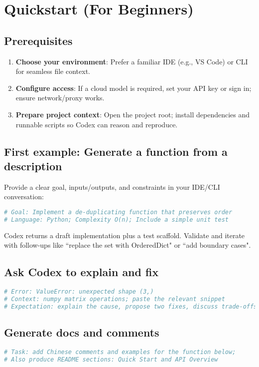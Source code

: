 \documentclass{article}
\begin{document}
\section{Quickstart (For Beginners)}
\subsection{Prerequisites}
\begin{enumerate}
  \item \textbf{Choose your environment}: Prefer a familiar IDE (e.g., VS Code) or CLI for seamless file context.
  \item \textbf{Configure access}: If a cloud model is required, set your API key or sign in; ensure network/proxy works.
  \item \textbf{Prepare project context}: Open the project root; install dependencies and runnable scripts so Codex can reason and reproduce.
\end{enumerate}

\subsection{First example: Generate a function from a description}
Provide a clear goal, inputs/outputs, and constraints in your IDE/CLI conversation:

\begin{lstlisting}[language=bash,caption={Describe the task in plain English}]
# Goal: Implement a de-duplicating function that preserves order
# Language: Python; Complexity O(n); Include a simple unit test
\end{lstlisting}

Codex returns a draft implementation plus a test scaffold. Validate and iterate with follow-ups like ``replace the set with OrderedDict" or ``add boundary cases".

\subsection{Ask Codex to explain and fix}
\begin{lstlisting}[language=bash,caption={Explain an error and propose fixes}]
# Error: ValueError: unexpected shape (3,)
# Context: numpy matrix operations; paste the relevant snippet
# Expectation: explain the cause, propose two fixes, discuss trade-offs
\end{lstlisting}

\subsection{Generate docs and comments}
\begin{lstlisting}[language=bash,caption={Generate comments and README snippets}]
# Task: add Chinese comments and examples for the function below;
# Also produce README sections: Quick Start and API Overview
\end{lstlisting}
\end{document}

